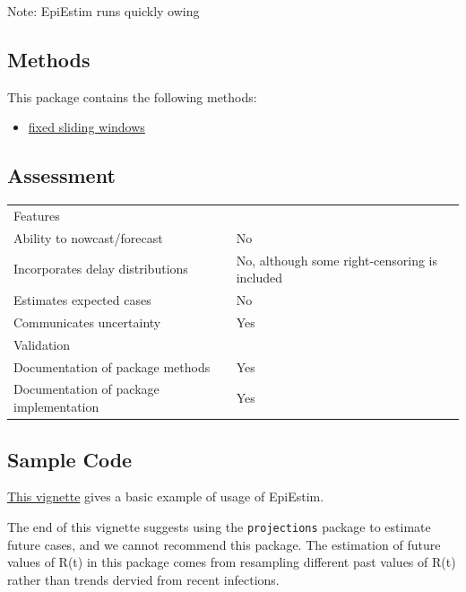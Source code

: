 \documentclass[
  letterpaper,
  DIV=11,
  numbers=noendperiod]{scrreprt}
\providecommand{\tightlist}{%
  \setlength{\itemsep}{0pt}\setlength{\parskip}{0pt}}\usepackage{longtable,booktabs,array}
\begin{document}
Note: EpiEstim runs quickly owing

\subsection*{Methods}\label{methods-2}

This package contains the following methods:

\begin{itemize}
\tightlist
\item
  \hyperref[sec-fixedwindow]{fixed sliding windows}
\end{itemize}

\subsection*{Assessment}\label{assessment-2}

\begin{longtable}[]{@{}
  >{\raggedright\arraybackslash}p{}
  >{\raggedright\arraybackslash}p{}@{}}
\toprule\noalign{}
\endhead
\bottomrule\noalign{}
\endlastfoot
Features & \\
Ability to nowcast/forecast & No \\
Incorporates delay distributions & No, although some right-censoring is
included \\
Estimates expected cases & No \\
Communicates uncertainty & Yes \\
Validation & \\
Documentation of package methods & Yes \\
Documentation of package implementation & Yes \\
\end{longtable}

\subsection*{Sample Code}\label{sample-code-2}

\href{https://mrc-ide.github.io/EpiEstim/articles/full_EpiEstim_vignette.html}{This
vignette} gives a basic example of usage of EpiEstim.

The end of this vignette suggests using the \texttt{projections} package
to estimate future cases, and we cannot recommend this package. The
estimation of future values of R(t) in this package comes from
resampling different past values of R(t) rather than trends dervied from
recent infections.
\end{document}

